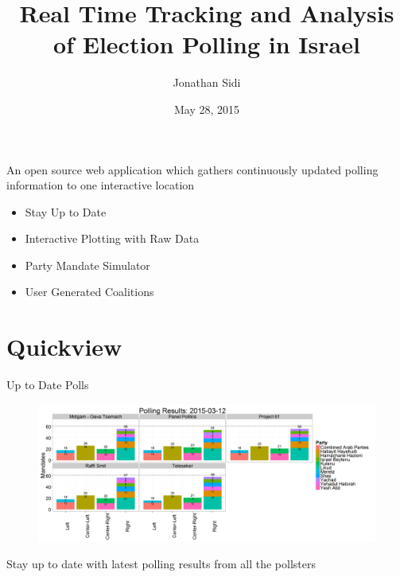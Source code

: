 \documentclass[11pt]{beamer}
\author{Jonathan Sidi}
\title[Election Analysis]{Real Time Tracking and Analysis of Election Polling in Israel}
\institute[Hebrew University]{Department of Statistics, Hebrew University of Jerusalem}
\date{May 28, 2015}
\begin{document}
\maketitle

\begin{frame}
\begin{block}{An open source web application which gathers continuously updated polling information to one interactive location}
\end{block}

\begin{itemize}
\item Stay Up to Date
\item Interactive Plotting with Raw Data
\item Party Mandate Simulator
\item User Generated Coalitions
\end{itemize}
\end{frame}

\section{Quickview}
\begin{frame}{Up to Date Polls}
				\begin{figure}[h]
				\centering
				\includegraphics[width=1\linewidth]{../www/LastDayPlot}
				\label{fig:LastDayPlot}
				\end{figure}
\begin{block}{Stay up to date with latest polling results from all the pollsters}
\end{block}
\end{frame}
\end{document}
